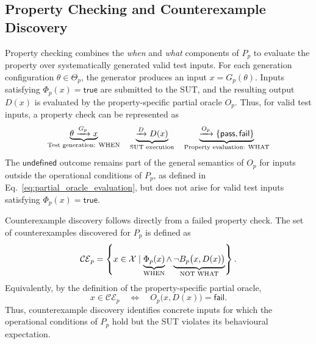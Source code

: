 \documentclass[preprint,12pt]{elsarticle}
\begin{document}
\subsection{Property Checking and Counterexample Discovery}
\label{sec:property_checking}

Property checking combines the \emph{when} and \emph{what} components of
\(P_p\) to evaluate the property over systematically generated valid test
inputs. For each generation configuration \(\theta \in \Theta_p\), the
generator produces an input \(x=G_p(\theta)\). Inputs satisfying
\(\Phi_p(x)=\mathsf{true}\) are submitted to the SUT, and the resulting
output \(D(x)\) is evaluated by the property-specific partial oracle \(O_p\).
Thus, for valid test inputs, a property check can be represented as
\begin{equation}
\begin{gathered}
\underbrace{
    \theta
    \xrightarrow{G_p}
    x
}_{\text{\scriptsize Test generation: WHEN}}
\quad
\underbrace{
    \xrightarrow{D}
    D(x)
}_{\text{\scriptsize SUT execution}}
\quad
\underbrace{
    \xrightarrow{O_p}
    \{\mathsf{pass},\mathsf{fail}\}
}_{\text{\scriptsize Property evaluation: WHAT}}
\end{gathered}
\label{eq:property_check}
\end{equation}
The \(\mathsf{undefined}\) outcome remains part of the general semantics of
\(O_p\) for inputs outside the operational conditions of \(P_p\), as defined
in Eq.~\ref{eq:partial_oracle_evaluation}, but does not arise for valid test
inputs satisfying \(\Phi_p(x)=\mathsf{true}\).

Counterexample discovery follows directly from a failed property check.
The set of counterexamples discovered for \(P_p\) is defined as
\begin{equation}
    \mathcal{CE}_p
    =
    \left\{
        x \in \mathcal{X}
        \mid
        \underbrace{\Phi_p(x)}_{\text{\scriptsize WHEN}}
        \land
        \underbrace{\neg B_p\bigl(x,D(x)\bigr)}_{\text{\scriptsize NOT WHAT}}
    \right\}.
    \label{eq:counterexample_set}
\end{equation}
Equivalently, by the definition of the property-specific partial oracle,
\begin{equation}
    x \in \mathcal{CE}_p
    \quad\Longleftrightarrow\quad
    O_p\bigl(x,D(x)\bigr)=\mathsf{fail}.
    \label{eq:counterexample_oracle}
\end{equation}
Thus, counterexample discovery identifies concrete inputs for which the
operational conditions of \(P_p\) hold but the SUT violates its behavioural
expectation.
\end{document}
